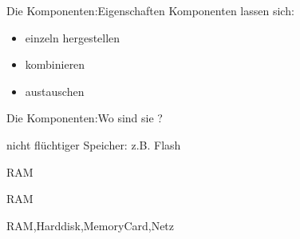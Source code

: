 \begin{frame}{Die Komponenten:Eigenschaften}
 Komponenten lassen sich:
 \begin{itemize}
  \item einzeln hergestellen
  \item kombinieren 
  \item austauschen
 \end{itemize}
\end{frame}

\begin{frame}{Die Komponenten:Wo sind sie ?}
 \begin{description}[BootLoader]
  \item[BootLoader] nicht flüchtiger Speicher: z.B. Flash
  \item[Kernel] RAM
  \item[libc] RAM
  \item[\unix] RAM,Harddisk,MemoryCard,Netz 
 \end{description}
\end{frame}

